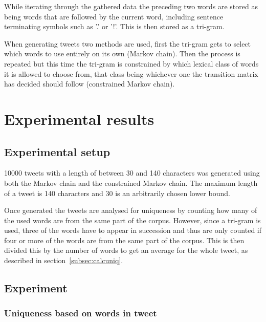 \documentclass[a4paper,12pt]{article}
\begin{document}
While iterating through the gathered data the preceding two words are stored as being words that are followed by the current word, including sentence terminating symbols such as '.' or '!'. This is then stored as a tri-gram.

When generating tweets two methods are used, first the tri-gram gets to select which words to use entirely on its own (Markov chain). Then the process is repeated but this time the tri-gram is constrained by which lexical class of words it is allowed to choose from, that class being whichever one the transition matrix has decided should follow (constrained Markov chain).

\section{Experimental results}
\label{sec:exps}

\subsection{Experimental setup}
10000 tweets with a length of between 30 and 140 characters was generated using both the Markov chain and the constrained Markov chain.
The maximum length of a tweet is 140 characters and 30 is an arbitrarily chosen lower bound.

Once generated the tweets are analysed for uniqueness by counting how many of the used words are from the same part of the corpus. However, since a tri-gram is used, three of the words have to appear in succession and thus are only counted if four or more of the words are from the same part of the corpus. This is then divided this by the number of words to get an average for the whole tweet, as described in section~\ref{subsec:calcuniq}.

\newpage
\subsection{Experiment}

\subsubsection{Uniqueness based on words in tweet}
\end{document}
